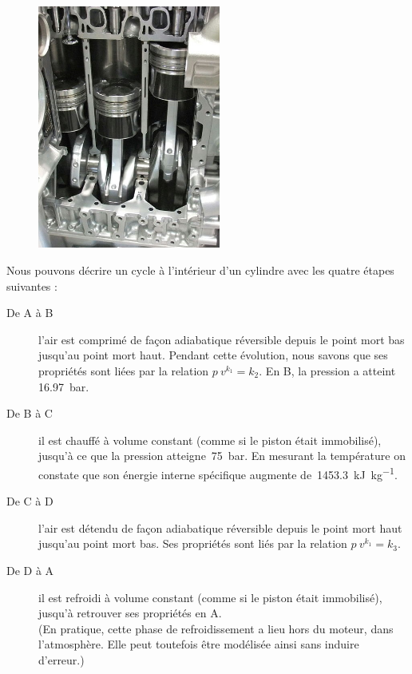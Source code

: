 		\begin{figure}
			\begin{center}
				\includegraphics[width=6cm, max width=0.8\columnwidth]{images/pistons_cutaway.jpg}
			\end{center}
			\label{fig_exo_pistons}
		\end{figure}
	
	Nous pouvons décrire un cycle à l’intérieur d’un cylindre avec les quatre étapes suivantes :
	
	\begin{description}
			\item [De A à B] l’air est comprimé de façon adiabatique réversible depuis le point mort bas jusqu’au point mort haut. Pendant cette évolution, nous savons que ses propriétés sont liées par la relation $p \ v^{k_1} = k_2$. En B, la pression a atteint \SI{16,97}{\bar}.
			\item [De B à C] il est chauffé à volume constant (comme si le piston était immobilisé), jusqu’à ce que la pression atteigne~\SI{75}{\bar}. En mesurant la température on constate que son énergie interne spécifique augmente de~\SI{1453,3}{\kilo\joule\per\kilogram}.
			\item [De C à D] l’air est détendu de façon adiabatique réversible depuis le point mort haut jusqu’au point mort bas. Ses propriétés sont liés par la relation $p \ v^{k_1} = k_3$.
			\item [De D à A] il est refroidi à volume constant (comme si le piston était immobilisé), jusqu’à retrouver ses propriétés en A.\\
				(En pratique, cette phase de refroidissement a lieu hors du moteur, dans l’atmosphère. Elle peut toutefois être modélisée ainsi sans induire d’erreur.)
	\end{description}

